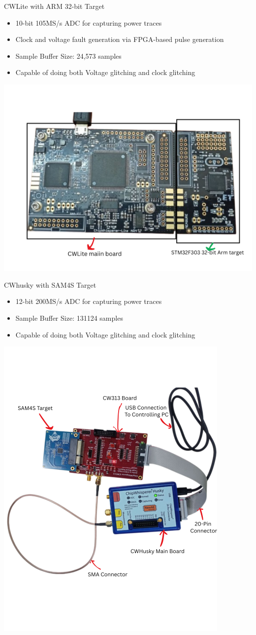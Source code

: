 \documentclass{beamer}
\newenvironment{tres important}[2][]{
	\setkeys{EmphEqEnv}{#2}
	\setkeys{EmphEqOpt}{box={\setlength{\fboxsep}{10pt}\fcolorbox{myNewColorA}{white}},#1}
	\EmphEqMainEnv}
{\endEmphEqMainEnv}
\begin{document}
\begin{frame}[fragile]{CWLite with ARM 32-bit Target}
  \centering
  \begin{itemize}
    \item 10-bit 105MS/s ADC for capturing power traces
    \item Clock and voltage fault generation via FPGA-based pulse generation
    \item Sample Buffer Size:	24,573 samples
    \item Capable of doing both Voltage glitching and clock glitching
  \end{itemize}
  \includegraphics[width=0.6\linewidth]{images/cwlite.png}
  \smallskip

\end{frame}
\begin{frame}[fragile]{CWhusky with SAM4S Target}
  \centering
  \begin{itemize}
    \item 12-bit 200MS/s ADC for capturing power traces
    \item Sample Buffer Size:	131124 samples
    \item Capable of doing both Voltage glitching and clock glitching
  \end{itemize}
 \centering
 \includegraphics[width=0.45\linewidth, angle=0]{images/cwhuskyannoted.png}

  \smallskip
\end{frame}
\end{document}
